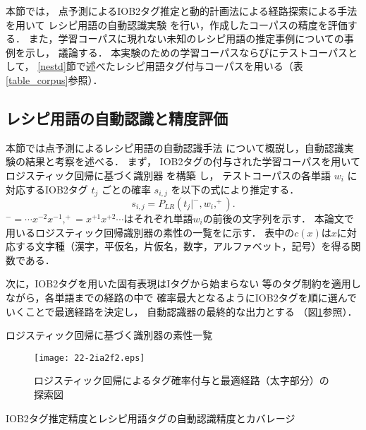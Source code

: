 \documentclass[japanese]{jnlp_1.4}
\def\Bdma#1{}
\def\tabref#1{}
\begin{document}
本節では，
点予測によるIOB2タグ推定と動的計画法による経路探索による手法
\cite{A.Machine.Learning.Approach.to.Recipe.Text.Processing}
を用いて
レシピ用語の自動認識実験
を行い，作成したコーパスの精度を評価する．
また，学習コーパスに現れない未知のレシピ用語の推定事例についての事例を示し，
議論する．
本実験のための学習コーパスならびにテストコーパスとして，
\ref{nestd}節で述べたレシピ用語タグ付与コーパスを用いる（表\ref{table_corpus}参照）．


\subsection{レシピ用語の自動認識と精度評価}
\label{neexp}

本節では点予測によるレシピ用語の自動認識手法
\cite{A.Machine.Learning.Approach.to.Recipe.Text.Processing}
について概説し，自動認識実験の結果と考察を述べる．
まず，
IOB2タグの付与された学習コーパスを用いて
ロジスティック回帰に基づく識別器
\cite{LIBLINEAR:.A.Library.for.Large.Linear.Classification}を構築
し，
テストコーパスの各単語
$w_i$
に対応するIOB2タグ
$t_{j}$
ごとの確率
$s_{i,j}$
を以下の式により推定する．
\[
  s_{i,j} = P_{LR}(t_{j}|\Bdma{x}^{-},w_i,\Bdma{x}^{+}).
\]
$\Bdma{x}^{-} = \cdots x^{-2}x^{-1}, \Bdma{x}^{+} = x^{+1}x^{+2}\cdots$はそれぞれ単語$w_i$の前後の文字列を示す．
本論文で用いるロジスティック回帰識別器の素性の一覧を\tabref{feat_lr}に示す．
表中の$c(x)$は$x$に対応する文字種（漢字，平仮名，片仮名，数字，アルファベット，記号）を得る関数である．

次に，IOB2タグを用いた固有表現はIタグから始まらない
等のタグ制約を適用しながら，各単語までの経路の中で
確率最大となるようにIOB2タグを順に選んでいくことで最適経路を決定し，
自動認識器の最終的な出力とする
（図\ref{figure:NE}参照）．

\begin{table}[b]
\caption{ロジスティック回帰に基づく識別器の素性一覧}
\label{feat_lr}

\end{table}

\begin{figure}[b]
  \begin{center}
\texttt{[image: 22-2ia2f2.eps]}
  \end{center}
  \caption{ロジスティック回帰によるタグ確率付与と最適経路（太字部分）の探索図}
  \label{figure:NE}
\end{figure}

\begin{table}[b]
  \caption{IOB2タグ推定精度とレシピ用語タグの自動認識精度とカバレージ}
  \label{table_exp_result}

\end{table}
\end{document}
